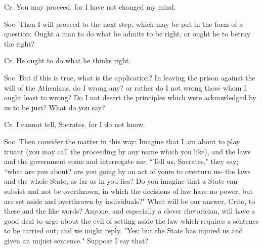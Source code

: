 Cr. You may proceed, for I have not changed my mind. 

Soc. Then I will proceed to the next step, which may be put in the
form of a question: Ought a man to do what he admits to be right,
or ought he to betray the right? 

Cr. He ought to do what he thinks right. 

Soc. But if this is true, what is the application? In leaving the
prison against the will of the Athenians, do I wrong any? or rather
do I not wrong those whom I ought least to wrong? Do I not desert
the principles which were acknowledged by us to be just? What do you
say? 

Cr. I cannot tell, Socrates, for I do not know. 

Soc. Then consider the matter in this way: Imagine that I am about
to play truant (you may call the proceeding by any name which you
like), and the laws and the government come and interrogate me: ``Tell
us, Socrates," they say; ``what are you about? are you going by an
act of yours to overturn us- the laws and the whole State, as far
as in you lies? Do you imagine that a State can subsist and not be
overthrown, in which the decisions of law have no power, but are set
aside and overthrown by individuals?" What will be our answer, Crito,
to these and the like words? Anyone, and especially a clever rhetorician,
will have a good deal to urge about the evil of setting aside the
law which requires a sentence to be carried out; and we might reply,
"Yes; but the State has injured us and given an unjust sentence."
Suppose I say that? 

